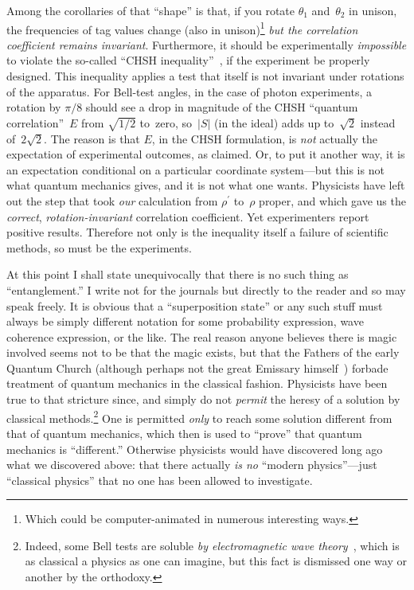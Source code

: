 \documentclass[9pt,technote]{IEEEtran}
\begin{document}
Among the corollaries of that ``shape'' is that, if you rotate
$\theta_1$ and~$\theta_2$ in unison, the frequencies of tag values
change (also in unison)\footnote{Which could be computer-animated in
  numerous interesting ways.} {\em{but the correlation coefficient
    remains invariant}}. Furthermore, it should be experimentally
{\em{impossible}} to violate the so-called ``CHSH
inequality''~\cite{enwiki:1170465048}, if the experiment be properly
designed. This inequality applies a test that itself is not invariant
under rotations of the apparatus. For Bell-test angles, in the case of
photon experiments, a rotation by $\pi\!/8$ should see a drop in
magnitude of the CHSH ``quantum correlation''~$E$ from $\sqrt{1\!/2}$
to~zero, so~$|S|$ (in the ideal) adds up to~$\sqrt2$ instead
of~$2\sqrt2$. The reason is that $E$, in the CHSH formulation, is
{\em{not}} actually the expectation of experimental outcomes, as
claimed. Or, to put it another way, it is an expectation conditional
on a particular coordinate system---but this is not what quantum
mechanics gives, and it is not what one wants. Physicists have left
out the step that took {\em{our}} calculation from $\rho^{\prime}$
to~$\rho$ proper, and which gave us the {\em{correct}},
{\em{rotation-invariant}} correlation coefficient. Yet experimenters
report positive results. Therefore not only is the inequality itself a
failure of scientific methods, so must be the experiments.

At this point I shall state unequivocally that there is no such thing
as ``entanglement.'' I write not for the journals but directly to the
reader and so may speak freely. It is obvious that a ``superposition
state'' or any such stuff must always be simply different notation for
some probability expression, wave coherence expression, or the
like. The real reason anyone believes there is magic involved seems
not to be that the magic exists, but that the Fathers of the early
Quantum Church (although perhaps not the great Emissary
himself~\cite{enwiki:1174555777}) forbade treatment of quantum
mechanics in the classical fashion. Physicists have been true to that
stricture since, and simply do not {\em{permit}} the heresy of a
solution by classical methods.\footnote{Indeed, some Bell tests are
  soluble {\em{by electromagnetic wave
      theory}}~\cite{kracklauer:nonloc-or-geom}, which is as classical
  a physics as one can imagine, but this fact is dismissed one way or
  another by the orthodoxy.} One is permitted {\em{only}} to reach
some solution different from that of quantum mechanics, which then is
used to ``prove'' that quantum mechanics is ``different.''  Otherwise
physicists would have discovered long ago what we discovered above:
that there actually {\em{is no}} ``modern physics''---just ``classical
physics'' that no one has been allowed to investigate.
\end{document}
